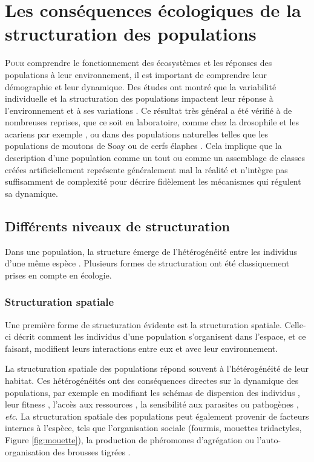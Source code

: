 \section{Les conséquences écologiques de la
structuration des populations}

\lettrine[lines=3]{P}{our} comprendre le fonctionnement des écosystèmes et les
réponses des populations à leur environnement, il est important de comprendre
leur démographie et leur dynamique. Des études ont montré que la variabilité
individuelle et la structuration des populations impactent leur réponse à
l'environnement et à ses variations \autocites{benton2005a}.
Ce résultat très général a été vérifié à de nombreuses reprises, que ce soit en
laboratoire, comme chez la drosophile \autocites{madalena1974a} et les acariens
par exemple \autocites{benton2005a}, ou dans des populations naturelles telles
que les populations de moutons de Soay \autocites{coulson2001a,ozgul2009a} ou de
cerfs élaphes \autocites{langvatn1999a}.
Cela implique que la description d'une population comme un tout ou comme un
assemblage de classes créées artificiellement représente généralement mal la
réalité et n'intègre pas suffisamment de complexité pour décrire fidèlement les
mécanismes qui régulent sa dynamique.

\subsection{Différents niveaux de structuration}

Dans une population, la structure émerge de l'hétérogénéité entre les
individus d'une même espèce \autocites{benton2006a}. Plusieurs formes de
structuration ont été classiquement prises en compte en écologie.

\subsubsection{Structuration spatiale}

Une première forme de structuration évidente est la structuration spatiale.
Celle-ci décrit comment les individus d'une population s'organisent dans
l'espace, et ce faisant, modifient leurs interactions entre eux et avec leur environnement. 

La structuration spatiale des populations répond souvent à l'hétérogénéité de
leur habitat. Ces hétérogénéités ont des conséquences directes sur la dynamique
des populations, par exemple en modifiant les schémas de dispersion des
individus \autocites{hiebeler2000a}, leur fitness \autocites{zajkac2008a},
l'accès aux ressources \autocites{burger2008a}, la sensibilité aux parasites ou
pathogènes \autocites{su2009a}, \textit{etc}. La structuration spatiale des
populations peut également provenir de facteurs internes à l'espèce, tels que
l'organisation sociale (fourmis, mouettes tridactyles, Figure
\ref{fig:mouette}), la production de phéromones d'agrégation
\autocites[Collemboles,][]{joosse1974aggregational,manica2001aggregation} ou
l'auto-organisation des brousses tigrées \autocites[Figure
\ref{fig:mouette}][]{deblauwe2008global}.

